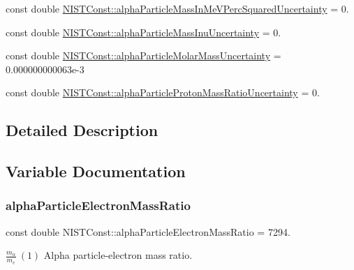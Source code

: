 \begin{DoxyCompactItemize}
\item 
const double \hyperlink{group___alpha_gab5e2063227c9f0ff40cda06ee27cb59d}{N\+I\+S\+T\+Const\+::alpha\+Particle\+Mass\+In\+Me\+V\+Perc\+Squared\+Uncertainty} = 0.
\item 
const double \hyperlink{group___alpha_ga3638266ad988e036f097bea4ac0afba3}{N\+I\+S\+T\+Const\+::alpha\+Particle\+Mass\+Inu\+Uncertainty} = 0.
\item 
const double \hyperlink{group___alpha_ga5f78e2dab7e63e1dd553c5e515dd6304}{N\+I\+S\+T\+Const\+::alpha\+Particle\+Molar\+Mass\+Uncertainty} = 0.\+000000000063e-\/3
\item 
const double \hyperlink{group___alpha_gaf3dee14bcd671fad701d7bbd15f2de45}{N\+I\+S\+T\+Const\+::alpha\+Particle\+Proton\+Mass\+Ratio\+Uncertainty} = 0.
\end{DoxyCompactItemize}


\subsection{Detailed Description}


\subsection{Variable Documentation}
\mbox{\label{group___alpha_ga9f00b32c60f1bc5b8a950b58e64d08c8}} 
\subsubsection{\texorpdfstring{alpha\+Particle\+Electron\+Mass\+Ratio}{alphaParticleElectronMassRatio}}
{\footnotesize\ttfamily const double N\+I\+S\+T\+Const\+::alpha\+Particle\+Electron\+Mass\+Ratio = 7294.}

$\frac{m_\alpha}{m_e} \ (1)$ Alpha particle-\/electron mass ratio. \mbox{\label{group___alpha_gab0ff5a8444a405504f7bc319cc48561d}} 
